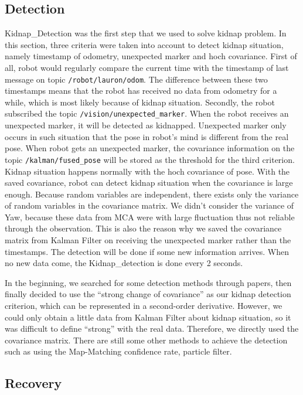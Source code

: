 \subsection{Detection}
Kidnap\_Detection was the first step that we used to solve kidnap problem. In this section, three criteria were taken into account to detect kidnap situation, namely timestamp of odometry, unexpected marker and hoch covariance. First of all, robot would regularly compare the current time with the timestamp of last message on topic \texttt{/robot/lauron/odom}. The difference between these two timestamps means that the robot has received no data from odometry for a while, which is most likely because of kidnap situation. Secondly, the robot subscribed the topic \texttt{/vision/unexpected\_marker}. When the robot receives an unexpected marker, it will be detected as kidnapped. Unexpected marker only occurs in such situation that the pose in robot’s mind is different from the real pose. When robot gets an unexpected marker, the covariance information on the topic \texttt{/kalman/fused\_pose} will be stored as the threshold for the third criterion. Kidnap situation happens normally with the hoch covariance of pose. With the saved covariance, robot can detect kidnap situation when the covariance is large enough. Because random variables are independent, there exists only the variance of random variables in the covariance matrix. We didn’t consider the variance of Yaw, because these data from MCA were with large fluctuation thus not reliable through the observation. This is also the reason why we saved the covariance matrix from Kalman Filter on receiving the unexpected marker rather than the timestamps. The detection will be done if some new information arrives. When no new data come, the Kidnap\_detection is done every 2 seconds.

In the beginning, we searched for some detection methods through papers, then finally decided to use the “strong change of covariance” as our kidnap detection criterion, which can be represented in a second-order derivative. However, we could only obtain a little data from Kalman Filter about kidnap situation, so it was difficult to define “strong” with the real data. Therefore, we directly used the covariance matrix. There are still some other methods to achieve the detection such as using the Map-Matching confidence rate, particle filter.

\subsection{Recovery}
